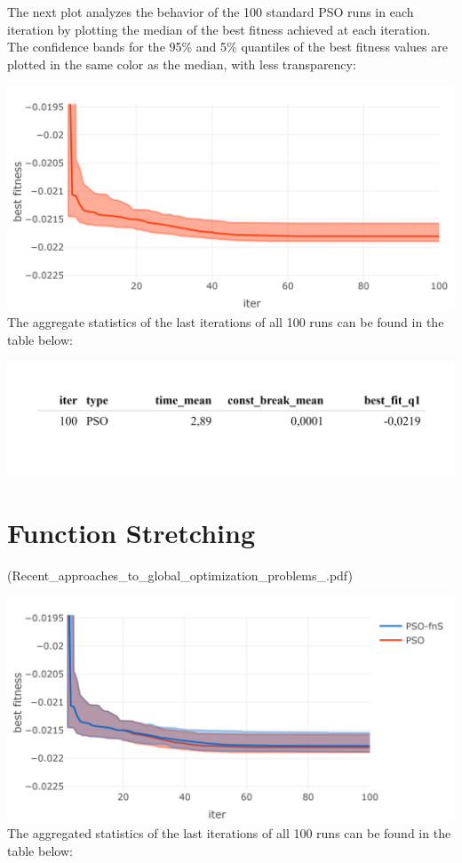 \documentclass[
  oneside]{book}
\begin{document}
The next plot analyzes the behavior of the 100 standard PSO runs in each iteration by plotting the median of the best fitness achieved at each iteration. The confidence bands for the 95\% and 5\% quantiles of the best fitness values are plotted in the same color as the median, with less transparency:

\includegraphics{Master_Thesis_files/figure-latex/unnamed-chunk-8-1.png}
The aggregate statistics of the last iterations of all 100 runs can be found in the table below:

\includegraphics{Master_Thesis_files/figure-latex/unnamed-chunk-9-1.png}

\hypertarget{function-stretching}{%
\section{Function Stretching}\label{function-stretching}}

(Recent\_approaches\_to\_global\_optimization\_problems\_.pdf)

\includegraphics{Master_Thesis_files/figure-latex/unnamed-chunk-10-1.png}
The aggregated statistics of the last iterations of all 100 runs can be found in the table below:
\end{document}
